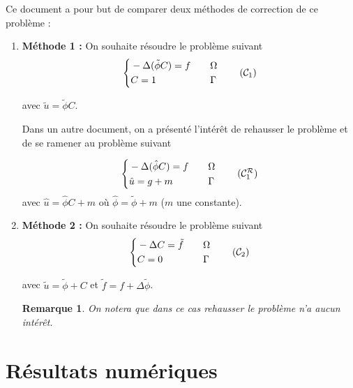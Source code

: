 \documentclass[french]{article}
\newtheorem*{Rem}{Remarque}
\begin{document}
	Ce document a pour but de comparer deux méthodes de correction de ce problème :
	\begin{enumerate}[label=\textbullet]
		\item \textbf{Méthode 1 : }
		On souhaite résoudre le problème suivant
		\begin{equation}
			\label{pbc1}
			\left\{\begin{aligned}
				&-\Delta (\tilde{\phi}C)=f \quad &&\Omega \\
				&C=1 \quad &&\Gamma
			\end{aligned}\right. \tag{$\mathcal{C}_1$}
		\end{equation}
		
		avec $\tilde{u}=\tilde{\phi}C$.
		
		Dans un autre document, on a présenté l'intérêt de rehausser le problème et de se ramener au problème suivant
		
		\begin{equation}
			\left\{\begin{aligned}
				&-\Delta (\hat{\phi}C)=f \quad &&\Omega \\
				&\hat{u}=g+m \quad &&\Gamma
			\end{aligned}\right. \label{pbc1r} \tag{$\mathcal{C}_1^\mathcal{R}$}
		\end{equation}
		avec $\hat{u}=\hat{\phi}C+m$ où $\hat{\phi}=\tilde{\phi}+m$ ($m$ une constante).
		
		
		\item \textbf{Méthode 2 : } On souhaite résoudre le problème suivant
		\begin{equation}
			\label{pbc2}
			\left\{\begin{aligned}
				&-\Delta C=\tilde{f} \quad &&\Omega \\
				&C=0 \quad &&\Gamma
			\end{aligned}\right. \tag{$\mathcal{C}_2$}
		\end{equation}
		
		avec $\tilde{u}=\tilde{\phi}+C$ et $\tilde{f}=f+\Delta\tilde{\phi}$.
		
		\begin{Rem}
			On notera que dans ce cas rehausser le problème n'a aucun intérêt.
		\end{Rem}
	\end{enumerate}

	\section*{Résultats numériques}
	
\end{document}
